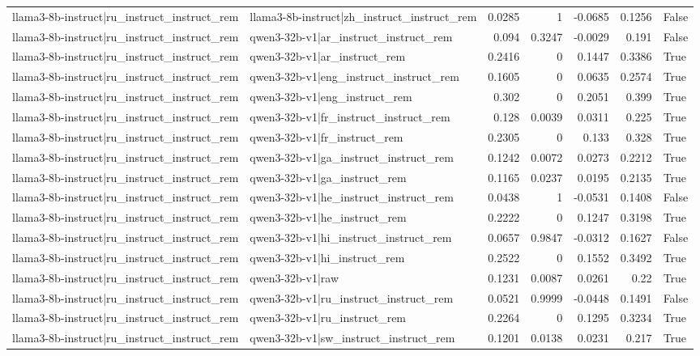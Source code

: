 \begin{table}
\begin{tabular}{l l r r r r l}
llama3-8b-instruct|ru_instruct_instruct_rem & llama3-8b-instruct|zh_instruct_instruct_rem & 0.0285 & 1 & -0.0685 & 0.1256 & False \\
llama3-8b-instruct|ru_instruct_instruct_rem & qwen3-32b-v1|ar_instruct_instruct_rem & 0.094 & 0.3247 & -0.0029 & 0.191 & False \\
llama3-8b-instruct|ru_instruct_instruct_rem & qwen3-32b-v1|ar_instruct_rem & 0.2416 & 0 & 0.1447 & 0.3386 & True \\
llama3-8b-instruct|ru_instruct_instruct_rem & qwen3-32b-v1|eng_instruct_instruct_rem & 0.1605 & 0 & 0.0635 & 0.2574 & True \\
llama3-8b-instruct|ru_instruct_instruct_rem & qwen3-32b-v1|eng_instruct_rem & 0.302 & 0 & 0.2051 & 0.399 & True \\
llama3-8b-instruct|ru_instruct_instruct_rem & qwen3-32b-v1|fr_instruct_instruct_rem & 0.128 & 0.0039 & 0.0311 & 0.225 & True \\
llama3-8b-instruct|ru_instruct_instruct_rem & qwen3-32b-v1|fr_instruct_rem & 0.2305 & 0 & 0.133 & 0.328 & True \\
llama3-8b-instruct|ru_instruct_instruct_rem & qwen3-32b-v1|ga_instruct_instruct_rem & 0.1242 & 0.0072 & 0.0273 & 0.2212 & True \\
llama3-8b-instruct|ru_instruct_instruct_rem & qwen3-32b-v1|ga_instruct_rem & 0.1165 & 0.0237 & 0.0195 & 0.2135 & True \\
llama3-8b-instruct|ru_instruct_instruct_rem & qwen3-32b-v1|he_instruct_instruct_rem & 0.0438 & 1 & -0.0531 & 0.1408 & False \\
llama3-8b-instruct|ru_instruct_instruct_rem & qwen3-32b-v1|he_instruct_rem & 0.2222 & 0 & 0.1247 & 0.3198 & True \\
llama3-8b-instruct|ru_instruct_instruct_rem & qwen3-32b-v1|hi_instruct_instruct_rem & 0.0657 & 0.9847 & -0.0312 & 0.1627 & False \\
llama3-8b-instruct|ru_instruct_instruct_rem & qwen3-32b-v1|hi_instruct_rem & 0.2522 & 0 & 0.1552 & 0.3492 & True \\
llama3-8b-instruct|ru_instruct_instruct_rem & qwen3-32b-v1|raw & 0.1231 & 0.0087 & 0.0261 & 0.22 & True \\
llama3-8b-instruct|ru_instruct_instruct_rem & qwen3-32b-v1|ru_instruct_instruct_rem & 0.0521 & 0.9999 & -0.0448 & 0.1491 & False \\
llama3-8b-instruct|ru_instruct_instruct_rem & qwen3-32b-v1|ru_instruct_rem & 0.2264 & 0 & 0.1295 & 0.3234 & True \\
llama3-8b-instruct|ru_instruct_instruct_rem & qwen3-32b-v1|sw_instruct_instruct_rem & 0.1201 & 0.0138 & 0.0231 & 0.217 & True \\

\end{tabular}
\end{table}
